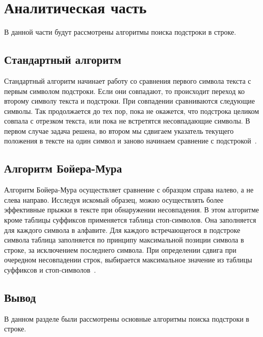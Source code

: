 \chapter{Аналитическая часть}

В данной части будут рассмотрены алгоритмы поиска подстроки в строке.

\section{Стандартный алгоритм}
Стандартный алгоритм начинает работу со сравнения первого символа текста с первым символом подстроки. 
Если они совпадают, то происходит переход ко второму символу текста и подстроки. 
При совпадении сравниваются следующие символы. Так продолжается до тех пор, пока не 
окажется, что подстрока целиком совпала с отрезком текста, или пока не встретятся несовпадающие символы. 
В первом случае задача решена, во втором мы сдвигаем указатель текущего положения в тексте на один символ 
и заново начинаем сравнение с подстрокой~\cite{mak}.

\section{Алгоритм Бойера-Мура}
Алгоритм Бойера-Мура осуществляет сравнение с образцом справа налево, а не слева направо. 
Исследуя искомый образец, можно осуществлять более эффективные прыжки в тексте при обнаружении несовпадения. 
В этом алгоритме кроме таблицы суффиксов применяется таблица стоп-символов. Она заполняется для каждого символа в
алфавите. Для каждого встречающегося в подстроке символа таблица заполняется по принципу максимальной позиции символа 
в строке, за исключением последнего символа. При определении сдвига при очередном несовпадении строк, выбирается 
максимальное значение из таблицы суффиксов и стоп-символов~\cite{mak}.

\section*{Вывод}
В данном разделе были рассмотрены основные алгоритмы поиска подстроки в строке.
